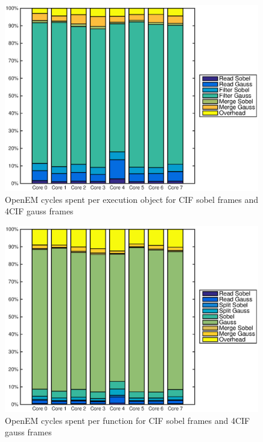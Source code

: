 \begin{figure}[h!]
    \begin{center}
        \includegraphics[width=0.99\textwidth]{images/openem_sobelcif_gauss4cif_eo.eps}
        \caption{OpenEM cycles spent per execution object for CIF sobel frames and 4CIF gauss frames}
    \end{center}
\end{figure}

\begin{figure}[h!]
    \begin{center}
        \includegraphics[width=0.99\textwidth]{images/openem_sobelcif_gauss4cif_func.eps}
        \caption{OpenEM cycles spent per function for CIF sobel frames and 4CIF gauss frames}
        \label{fig:oem8corefuncgauss4cif}
    \end{center}
\end{figure}


